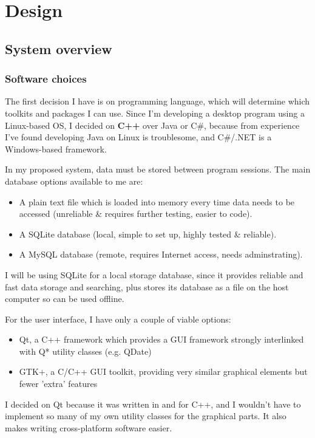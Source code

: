\section{Design}
\subsection{System overview}
\subsubsection{Software choices}

The first decision I have is on programming language, which will determine which
toolkits and packages I can use. Since I'm developing a desktop program using a
Linux-based OS, I decided on \textbf{C++} over Java or C\#, because from
experience I've found developing Java on Linux is troublesome, and C\#/.NET is a
Windows-based framework.

In my proposed system, data must be stored between program sessions. The main
database options available to me are:

\begin{itemize}
    \item A plain text file which is loaded into memory every time data needs to
        be accessed (unreliable \& requires further testing, easier to code).
    \item A SQLite database (local, simple to set up, highly tested \&
          reliable).
    \item A MySQL database (remote, requires Internet access, needs
          adminstrating).
\end{itemize}

I will be using SQLite for a local storage database, since it provides reliable
and fast data storage and searching, plus stores its database as a file on the
host computer so can be used offline.

For the user interface, I have only a couple of viable options:

\begin{itemize}
    \item Qt, a C++ framework which provides a GUI framework strongly
          interlinked with Q* utility classes (e.g. QDate)
    \item GTK+, a C/C++ GUI toolkit, providing very similar graphical elements
          but fewer 'extra' features
\end{itemize}

I decided on Qt because it was written in and for C++, and I wouldn't have to
implement so many of my own utility classes for the graphical parts. It also
makes writing cross-platform software easier.


